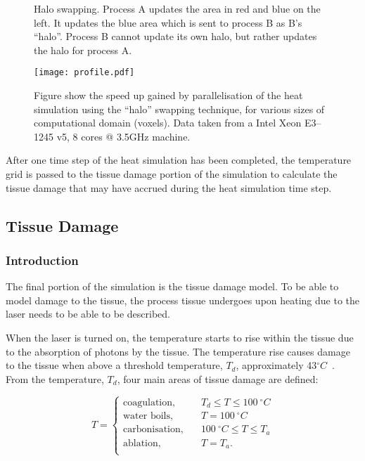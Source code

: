 
\begin{figure}
\centering
\def\svgwidth{350pt}

\caption{Halo swapping. Process A updates the area in red and blue on the left. It updates the blue area which is sent to process B as B's ``halo''. Process B cannot update its own halo, but rather updates the halo for process A.}
\label{fig:haloswap}
\end{figure}

\begin{figure}
\centering
\texttt{[image: profile.pdf]}
\caption{Figure show the speed up gained by parallelisation of the heat simulation using the ``halo'' swapping technique, for various sizes of computational domain (voxels). Data taken from a Intel Xeon E3--1245 v5, 8 cores @ 3.5GHz machine.}
\label{fig:parallel}
\end{figure}
After one time step of the heat simulation has been completed, the temperature grid is passed to the tissue damage portion of the simulation to calculate the tissue damage that may have accrued during the heat simulation time step.
\FloatBarrier
\newpage

\subsection{Tissue Damage}
\label{sec:tissuedamage}

\subsubsection*{Introduction}
The final portion of the simulation is the tissue damage model. To be able to model damage to the tissue, the process tissue undergoes upon heating due to the laser needs to be able to be described.

When the laser is turned on, the temperature starts to rise within the tissue due to the absorption of photons by the tissue. The temperature rise causes damage to the tissue when above a threshold temperature, $T_d$, approximately 43$^{\circ}C$~\cite{welch2011optical}.%
From the temperature, $T_d$, four main areas of tissue damage are defined:


\begin{equation}
T = 
     \begin{cases}
       \text{coagulation,} &\quad T_d\leq T \leq 100~^{\circ}C\\
       \text{water boils,} &\quad T=100~^{\circ}C\\
       \text{carbonisation,} &\quad 100~^{\circ}C \leq T \leq T_a\\
       \text{ablation,} &\quad T=T_a.\\
     \end{cases}
\end{equation}


